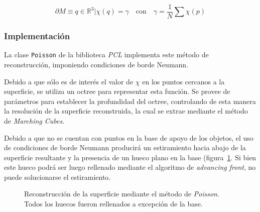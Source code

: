 		\[\partial M \equiv {q \in \mathbb{R}^3 | \chi(q) = \gamma} \quad \mbox{con}
			\quad \gamma = \frac{1}{N} \sum \chi(p) \]




	\subsubsection{Implementación}
	La clase \texttt{Poisson} de la biblioteca \emph{PCL} implementa este método de reconstrucción,
	imponiendo condiciones de borde Neumann.

	Debido a que sólo es de interés el valor de $\chi$ en los puntos cercanos a la superficie,
	se utiliza un octree para representar esta función. Se provee de parámetros para establecer la profundidad del octree,
	controlando de esta manera la resolución de la superficie reconstruida, la cual se extrae mediante el método de \emph{Marching Cubes}. 

	Debido a que no se cuentan con puntos en la base de apoyo de los objetos, el uso de condiciones de borde Neumann
	producirá un estiramiento hacia abajo de la superficie resultante y la presencia de
	un hueco plano en la base (figura~\ref{fig:fill_poisson}.
	Si bien este hueco podrá ser luego rellenado mediante el algoritmo de \emph{advancing front}, no puede solucionarse el estiramiento.



	\begin{figure}
		 
		\caption{\label{fig:fill_poisson}Reconstrucción de la superficie mediante el método de \emph{Poisson}. Todos los huecos fueron rellenados a excepción de la base.}
	\end{figure}

